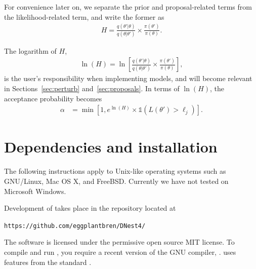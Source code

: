 \documentclass[article, nojss]{jss}
\newcommand{\params}{\theta}
\begin{document}
For convenience later on, we 
separate the prior and proposal-related terms from
the likelihood-related term, and write the former as
\begin{align}
H = \frac{q(\params'|\params)}{q(\params | \params')}
\times \frac{\pi(\params')}{\pi(\params)}.
\end{align}

The logarithm of $H$,
\begin{align}
\ln(H) = \ln\left[\frac{q(\params'|\params)}{q(\params | \params')}
\times \frac{\pi(\params')}{\pi(\params)}\right],
\end{align}
is the user's responsibility when implementing models,
and will become relevant in Sections~\ref{sec:perturb}
and~\ref{sec:proposals}.
In terms of $\ln(H)$, the
acceptance probability becomes
\begin{align}
\alpha &= \min\left[1,
e^{\ln(H)}\times
\mathds{1}\left(L(\params') > \ell_j\right)
\right].\label{eqn:logH}
\end{align}








\section{Dependencies and installation}\label{sec:installation}
The following instructions apply to Unix-like operating systems such as
GNU/Linux, Mac OS X, and FreeBSD. Currently we have not tested
 on Microsoft Windows.

Development of  takes place in the  repository located at
\begin{center}
{\tt https://github.com/eggplantbren/DNest4/}\\
\end{center}
The software
is licensed under the permissive open source
MIT license. To compile and run ,
you require a recent version of the GNU
 compiler,  \citep{gcc}.
 uses features from the  standard
\citep{c++11}.
\end{document}
